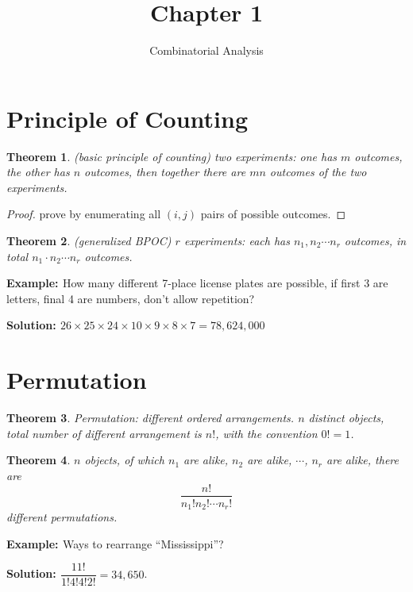 \documentclass[11pt, a4paper]{MATH2421}
\title{Chapter 1}
\subtitle{Combinatorial Analysis}
\newtheorem*{theorem}{Theorem}
\newcommand{\eg}{{\bf {Example: }}}
\newcommand{\sol}{{\bf {Solution: }}}
\begin{document}
\begin{spacing}{1.3}

    \section{Principle of Counting}

    \begin{theorem}
        (basic principle of counting) two experiments: 
        one has $m$ outcomes, the other has $n$ outcomes, 
        then together there are $mn$ outcomes of the two 
        experiments.
    \end{theorem}

    \begin{proof}
        prove by enumerating all $(i,j)$ pairs of 
        possible outcomes.
    \end{proof}

    \begin{theorem}
        (generalized BPOC) $r$ experiments: 
        each has $n_1,n_2\cdots n_r$ outcomes, in total 
        $n_1\cdot n_2\cdots n_r$ outcomes.
    \end{theorem}

    \eg How many different 7-place license plates are possible, 
        if first 3 are letters, final 4 are numbers, don't allow 
        repetition?

    \sol $26\times 25\times 24\times 10\times 9\times 8
    \times 7=78,624,000$

    \section{Permutation}

    \begin{theorem}
        Permutation: different ordered arrangements.
        $n$ distinct objects, total number of different 
        arrangement is $n!$, with the convention $0!=1$.
    \end{theorem}

    \begin{theorem}
        $n$ objects, of which $n_1$ are alike, $n_2$ are alike, 
        $\cdots$, $n_r$ are alike, there are
        $$\frac{n!}{n_1!n_2!\cdots n_r!}$$ 
        different permutations.
    \end{theorem}

    \eg Ways to rearrange ``Mississippi''?

    \sol $\dfrac{11!}{1!4!4!2!}=34,650$.


\end{spacing}
\end{document}
